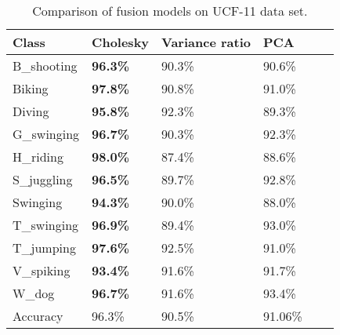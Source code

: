 \begin{table}[]
\centering
\caption{Comparison of fusion models on UCF-11 data set.}\label{tbl:per-action fusionucf}
\begin{tabular}{|l||l|l|l|l|l|}
\hline
Class            & Cholesky & Variance ratio & PCA   \\ \hline  \hline
B\_shooting       & \textbf{96.3\%}    &  90.3\%   &  90.6\%  \\
Biking           & \textbf{97.8\%}    &  90.8\%   &  91.0\%    \\
Diving           & \textbf{95.8\%}    &  92.3\%   &  89.3\%   \\
G\_swinging       & \textbf{96.7\%}    &  90.3\%   &  92.3\%   \\
H\_riding         & \textbf{98.0\%}    &  87.4\%   &  88.6\%    \\
S\_juggling       & \textbf{96.5\%}    &  89.7\%   &  92.8\%    \\
Swinging         & \textbf{94.3\%}    &  90.0\%   &  88.0\%    \\
T\_swinging       & \textbf{96.9\%}    &  89.4\%   &  93.0\%   \\
T\_jumping        & \textbf{97.6\%}    &  92.5\%   &  91.0\%    \\
V\_spiking        &\textbf{93.4\%}    &  91.6\%   &  91.7\%   \\
W\_dog            & \textbf{96.7\%}    &  91.6\%   &  93.4\%   \\ \hline \hline
Accuracy &  96.3\%   &  90.5\%   &   91.06\%   \\ \hline
\end{tabular}
\end{table}

